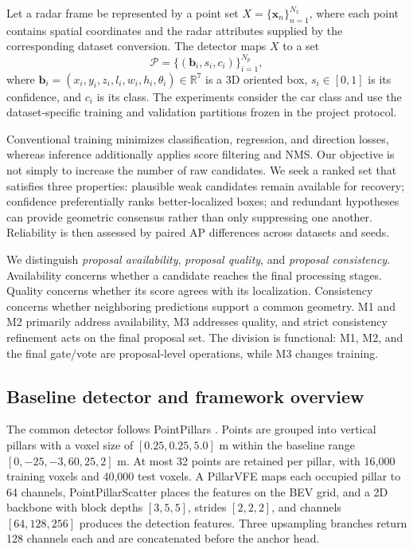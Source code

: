 \documentclass[sensors,article,submit,pdftex,moreauthors]{Definitions/mdpi}
\begin{document}
Let a radar frame be represented by a point set
$X=\{\mathbf{x}_n\}_{n=1}^{N_x}$, where each point contains spatial
coordinates and the radar attributes supplied by the corresponding dataset
conversion. The detector maps $X$ to a set
\begin{equation}
\mathcal{P}=\{(\mathbf{b}_i,s_i,c_i)\}_{i=1}^{N_p},
\end{equation}
where $\mathbf{b}_i=(x_i,y_i,z_i,l_i,w_i,h_i,\theta_i)\in\mathbb{R}^7$
is a 3D oriented box, $s_i\in[0,1]$ is its confidence, and $c_i$ is its
class. The experiments consider the car class and use the dataset-specific
training and validation partitions frozen in the project protocol.

Conventional training minimizes classification, regression, and direction
losses, whereas inference additionally applies score filtering and NMS. Our
objective is not simply to increase the number of raw candidates. We seek a
ranked set that satisfies three properties: plausible weak candidates remain
available for recovery; confidence preferentially ranks better-localized
boxes; and redundant hypotheses can provide geometric consensus rather than
only suppressing one another. Reliability is then assessed by paired AP
differences across datasets and seeds.

We distinguish \emph{proposal availability}, \emph{proposal quality}, and
\emph{proposal consistency}. Availability concerns whether a candidate reaches
the final processing stages. Quality concerns whether its score agrees with
its localization. Consistency concerns whether neighboring predictions support
a common geometry. M1 and M2 primarily address availability, M3 addresses
quality, and strict consistency refinement acts on the final proposal set.
The division is functional: M1, M2, and the final gate/vote are proposal-level
operations, while M3 changes training.

\subsection{Baseline detector and framework overview}

The common detector follows PointPillars
\cite{lang2019pointpillars}. Points are grouped into vertical pillars with a
voxel size of $[0.25,0.25,5.0]$ m within the baseline range
$[0,-25,-3,60,25,2]$ m. At most 32 points are retained per pillar, with
16,000 training voxels and 40,000 test voxels. A PillarVFE maps each occupied
pillar to 64 channels, PointPillarScatter places the features on the BEV grid,
and a 2D backbone with block depths $[3,5,5]$, strides $[2,2,2]$, and channels
$[64,128,256]$ produces the detection features. Three upsampling branches
return 128 channels each and are concatenated before the anchor head.
\end{document}
